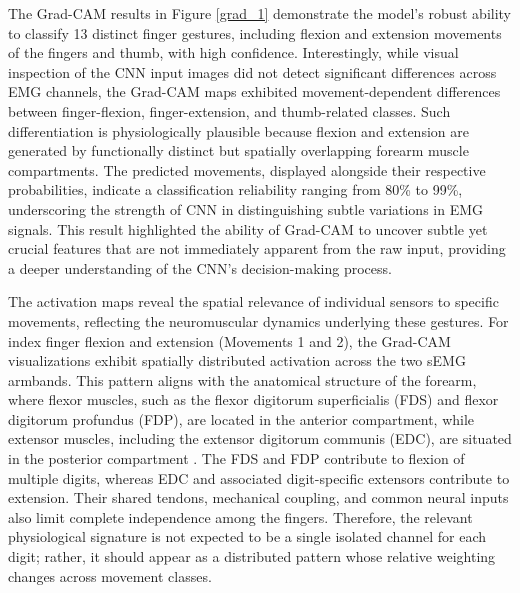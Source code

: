 \documentclass[preprint,12pt]{elsarticle}
\begin{document}

The Grad-CAM results in Figure \ref{grad_1} demonstrate the model's robust ability to classify 13 distinct finger gestures, including flexion and extension movements of the fingers and thumb, with high confidence. Interestingly, while visual inspection of the CNN input images did not detect significant differences across EMG channels, the Grad-CAM maps exhibited movement-dependent differences between finger-flexion, finger-extension, and thumb-related classes. Such differentiation is physiologically plausible because flexion and extension are generated by functionally distinct but spatially overlapping forearm muscle compartments. The predicted movements, displayed alongside their respective probabilities, indicate a classification reliability ranging from 80\% to 99\%, underscoring the strength of CNN in distinguishing subtle variations in EMG signals. This result highlighted the ability of Grad-CAM to uncover subtle yet crucial features that are not immediately apparent from the raw input, providing a deeper understanding of the CNN's decision-making process.

The activation maps reveal the spatial relevance of individual sensors to specific movements, reflecting the neuromuscular dynamics underlying these gestures. For index finger flexion and extension (Movements 1 and 2), the Grad-CAM visualizations exhibit spatially distributed activation across the two sEMG armbands. This pattern aligns with the anatomical structure of the forearm, where flexor muscles, such as the flexor digitorum superficialis (FDS) and flexor digitorum profundus (FDP), are located in the anterior compartment, while extensor muscles, including the extensor digitorum communis (EDC), are situated in the posterior compartment \cite{Kikuchi}. The FDS and FDP contribute to flexion of multiple digits, whereas EDC and associated digit-specific extensors contribute to extension. Their shared tendons, mechanical coupling, and common neural inputs also limit complete independence among the fingers. Therefore, the relevant physiological signature is not expected to be a single isolated channel for each digit; rather, it should appear as a distributed pattern whose relative weighting changes across movement classes.
\end{document}
